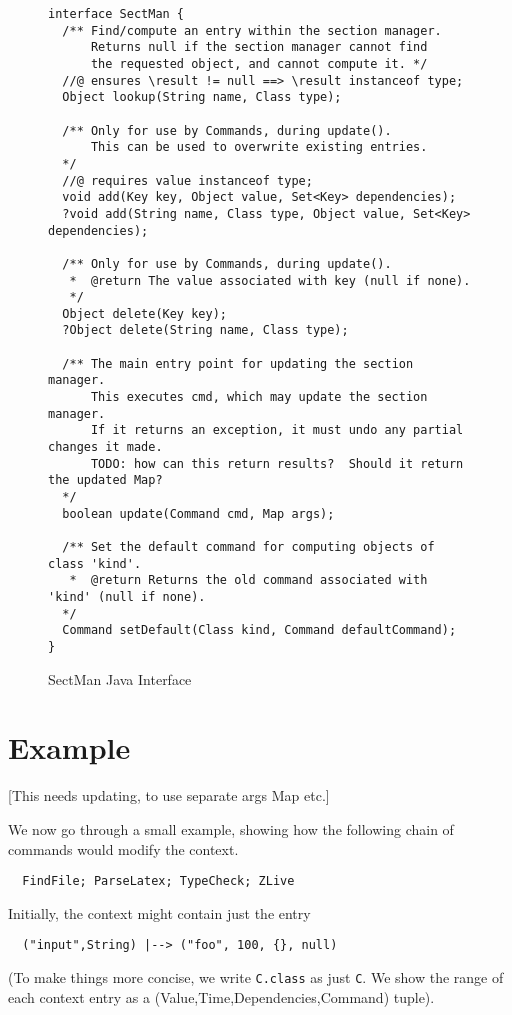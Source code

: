 \documentclass{llncs} %
\begin{document}
\begin{figure}[htbp]
  \centering
\begin{small}
\begin{verbatim}
interface SectMan {
  /** Find/compute an entry within the section manager.
      Returns null if the section manager cannot find
      the requested object, and cannot compute it. */ 
  //@ ensures \result != null ==> \result instanceof type;
  Object lookup(String name, Class type);

  /** Only for use by Commands, during update().
      This can be used to overwrite existing entries.
  */
  //@ requires value instanceof type;
  void add(Key key, Object value, Set<Key> dependencies);
  ?void add(String name, Class type, Object value, Set<Key> dependencies);

  /** Only for use by Commands, during update().
   *  @return The value associated with key (null if none).
   */
  Object delete(Key key);
  ?Object delete(String name, Class type);

  /** The main entry point for updating the section manager.
      This executes cmd, which may update the section manager.
      If it returns an exception, it must undo any partial changes it made.
      TODO: how can this return results?  Should it return the updated Map?
  */
  boolean update(Command cmd, Map args);

  /** Set the default command for computing objects of class 'kind'.
   *  @return Returns the old command associated with 'kind' (null if none).
  */
  Command setDefault(Class kind, Command defaultCommand);
}
\end{verbatim}
\end{small}
  \caption{SectMan Java Interface}
  \label{fig:sectman}
\end{figure}


\section{Example}

[This needs updating, to use separate args Map etc.]

We now go through a small example, showing how the following
chain of commands would modify the context.
\begin{verbatim}
  FindFile; ParseLatex; TypeCheck; ZLive
\end{verbatim}

Initially, the context might contain just the entry
\begin{small}
\begin{verbatim}
  ("input",String) |--> ("foo", 100, {}, null)
\end{verbatim}
\end{small}
(To make things more concise, we write \texttt{C.class} as just \texttt{C}.
We show the range of each context entry as a (Value,Time,Dependencies,Command)
tuple). 
\end{document}
